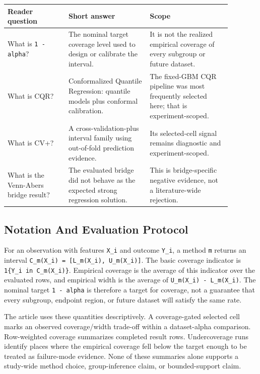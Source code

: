 \documentclass[11pt]{article}
\begin{document}
\begingroup
\footnotesize
\setlength{\tabcolsep}{2pt}
\renewcommand{\arraystretch}{1.18}
\begin{tabular}{@{}>{\RaggedRight\arraybackslash}p{0.240\linewidth}>{\RaggedRight\arraybackslash}p{0.320\linewidth}>{\RaggedRight\arraybackslash}p{0.320\linewidth}@{}}
\toprule
Reader question & Short answer & Scope \\
\midrule
What is \texttt{1 - alpha}? & The nominal target coverage level used to design or calibrate the interval. & It is not the realized empirical coverage of every subgroup or future dataset. \\
What is CQR? & Conformalized Quantile Regression: quantile models plus conformal calibration. & The fixed-GBM CQR pipeline was most frequently selected here; that is experiment-scoped. \\
What is CV+? & A cross-validation-plus interval family using out-of-fold prediction evidence. & Its selected-cell signal remains diagnostic and experiment-scoped. \\
What is the Venn-Abers bridge result? & The evaluated bridge did not behave as the expected strong regression solution. & This is bridge-specific negative evidence, not a literature-wide rejection. \\
\bottomrule
\end{tabular}
\endgroup

\subsection{Notation And Evaluation Protocol}

For an observation with features \texttt{X\_\allowbreak{}i} and outcome \texttt{Y\_\allowbreak{}i}, a method \texttt{m} returns an interval \texttt{C\_\allowbreak{}m(X\_\allowbreak{}i) = [L\_\allowbreak{}m(X\_\allowbreak{}i), U\_\allowbreak{}m(X\_\allowbreak{}i)]}. The basic coverage indicator is \texttt{1\{Y\_\allowbreak{}i in C\_\allowbreak{}m(X\_\allowbreak{}i)\}}. Empirical coverage is the average of this indicator over the evaluated rows, and empirical width is the average of \texttt{U\_\allowbreak{}m(X\_\allowbreak{}i) -\allowbreak{} L\_\allowbreak{}m(X\_\allowbreak{}i)}. The nominal target \texttt{1 - alpha} is therefore a target for coverage, not a guarantee that every subgroup, endpoint region, or future dataset will satisfy the same rate.

The article uses these quantities descriptively. A coverage-gated selected cell marks an observed coverage/width trade-off within a dataset-alpha comparison. Row-weighted coverage summarizes completed result rows. Undercoverage runs identify places where the empirical coverage fell below the target enough to be treated as failure-mode evidence. None of these summaries alone supports a study-wide method choice, group-inference claim, or bounded-support claim.
\end{document}
